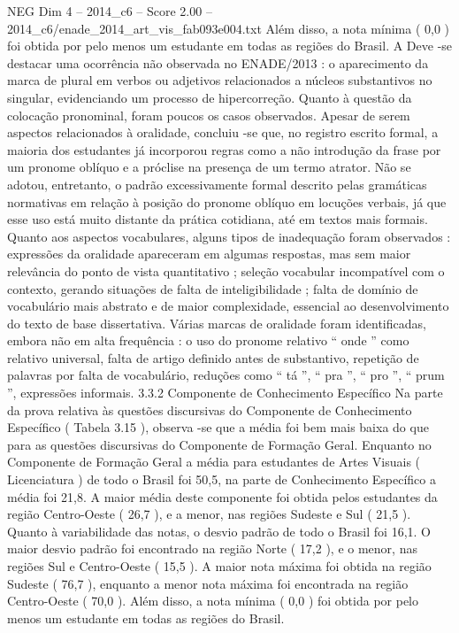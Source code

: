 \begin{textsample}{NEG Dim 4 – 2014\_c6 – Score 2.00 – 2014\_c6/enade\_2014\_art\_vis\_fab093e004.txt}
Além disso, a nota mínima ( 0,0 ) foi obtida por pelo menos um estudante em todas as regiões do Brasil.
A Deve -se destacar uma ocorrência não observada no ENADE/2013 : o aparecimento da marca de plural em verbos ou adjetivos relacionados a núcleos substantivos no singular, evidenciando um processo de hipercorreção.
Quanto à questão da colocação pronominal, foram poucos os casos observados.
Apesar de serem aspectos relacionados à oralidade, concluiu -se que, no registro escrito formal, a maioria dos estudantes já incorporou regras como a não introdução da frase por um pronome oblíquo e a próclise na presença de um termo atrator.
Não se adotou, entretanto, o padrão excessivamente formal descrito pelas gramáticas normativas em relação à posição do pronome oblíquo em locuções verbais, já que esse uso está muito distante da prática cotidiana, até em textos mais formais.
Quanto aos aspectos vocabulares, alguns tipos de inadequação foram observados : expressões da oralidade apareceram em algumas respostas, mas sem maior relevância do ponto de vista quantitativo ; seleção vocabular incompatível com o contexto, gerando situações de falta de inteligibilidade ; falta de domínio de vocabulário mais abstrato e de maior complexidade, essencial ao desenvolvimento do texto de base dissertativa.
Várias marcas de oralidade foram identificadas, embora não em alta frequência : o uso do pronome relativo “ onde ” como relativo universal, falta de artigo definido antes de substantivo, repetição de palavras por falta de vocabulário, reduções como “ tá ”, “ pra ”, “ pro ”, “ prum ”, expressões informais. 3.3.2 Componente de Conhecimento Específico Na parte da prova relativa às questões discursivas do Componente de Conhecimento Específico ( Tabela 3.15 ), observa -se que a média foi bem mais baixa do que para as questões discursivas do Componente de Formação Geral.
Enquanto no Componente de Formação Geral a média para estudantes de Artes Visuais ( Licenciatura ) de todo o Brasil foi 50,5, na parte de Conhecimento Específico a média foi 21,8.
A maior média deste componente foi obtida pelos estudantes da região Centro-Oeste ( 26,7 ), e a menor, nas regiões Sudeste e Sul ( 21,5 ).
Quanto à variabilidade das notas, o desvio padrão de todo o Brasil foi 16,1.
O maior desvio padrão foi encontrado na região Norte ( 17,2 ), e o menor, nas regiões Sul e Centro-Oeste ( 15,5 ).
A maior nota máxima foi obtida na região Sudeste ( 76,7 ), enquanto a menor nota máxima foi encontrada na região Centro-Oeste ( 70,0 ).
Além disso, a nota mínima ( 0,0 ) foi obtida por pelo menos um estudante em todas as regiões do Brasil.

\end{textsample}
